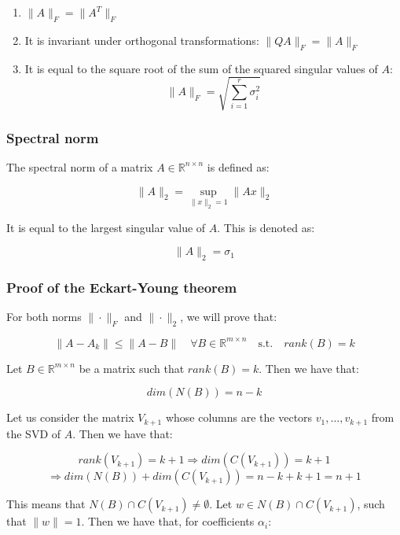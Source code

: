 \begin{enumerate}
    \item $\|A\|_F = \|A^T\|_F$
    \item It is invariant under orthogonal transformations: $\|Q A\|_F = \|A\|_F$
    \item It is equal to the square root of the sum of the squared singular values of $A$: 
    \begin{equation}
        \|A\|_F = \sqrt{\sum_{i=1}^{r} \sigma_i^2}
    \end{equation}
\end{enumerate}

\subsubsection{Spectral norm}

The spectral norm of a matrix $A \in \mathbb{R}^{n \times n}$ is defined as:

\begin{equation}
    \|A\|_2 = \sup_{\|x\|_2 = 1} \|A x\|_2
\end{equation}

It is equal to the largest singular value of $A$. This is denoted as:

\begin{equation}
    \|A\|_2 = \sigma_1
\end{equation}

\subsubsection{Proof of the Eckart-Young theorem}

For both norms $\| \cdot \|_F$ and $\| \cdot \|_2$, we will prove that:

$$\| A - A_k \| \leq \| A - B \| \quad \forall B \in \mathbb{R}^{m \times n} \quad \text{s.t.} \quad rank(B) = k$$

Let $B \in \mathbb{R}^{m \times n}$ be a matrix such that $rank(B) = k$. Then we have that:

$$dim(N(B)) = n - k$$

Let us consider the matrix $V_{k+1}$ whose columns are the vectors $v_{1}, \ldots, v_{k+1}$ 
from the SVD of $A$. Then we have that:

$$rank(V_{k+1}) = k+1 \Rightarrow dim(C(V_{k+1})) = k + 1$$
$$\Rightarrow dim(N(B)) + dim(C(V_{k+1})) = n - k + k + 1 = n + 1$$


This means that $N(B) \cap C(V_{k+1}) \neq \emptyset$. Let $w \in N(B) \cap C(V_{k+1})$, 
such that $\|w\| = 1$. Then we have that, for coefficients $\alpha_i$:

